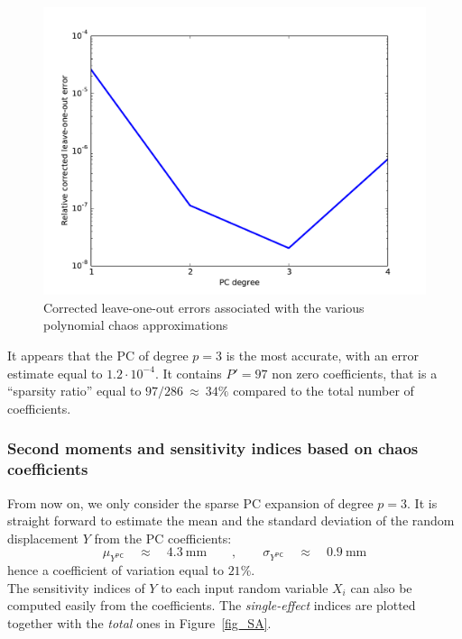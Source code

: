 \documentclass[11pt]{article}
\begin{document}
\begin{figure}[Hhbtp]
  \begin{center}
    \includegraphics[width=12cm]{Figures/Truss_errors.pdf}
  \end{center}
  \caption{Corrected leave-one-out errors associated with the various polynomial chaos approximations}
  \label{fig_errors}
\end{figure}

It appears that the PC of degree $p=3$ is the most accurate, with an error estimate equal to $1.2 \cdot 10^{-4}$. It contains $P'=97$ non zero coefficients, that is a ``sparsity ratio'' equal to $97 / 286~\approx~ 34\%$ compared to the total number of coefficients.

\subsubsection{Second moments and sensitivity indices based on chaos coefficients}

From now on, we only consider the sparse PC expansion of degree $p=3$. It is straight forward to estimate the mean and the standard deviation of the random displacement $Y$ from the PC coefficients:
\begin{equation}
  \mu_{Y^\textsf{PC}} \quad \approx \quad 4.3~\mbox{mm} \qquad , \qquad \sigma_{Y^\textsf{PC}} \quad \approx \quad 0.9~\mbox{mm}
\end{equation}
hence a coefficient of variation equal to $21\%$. \\

The sensitivity indices of $Y$ to each input random variable $X_i$ can also be computed easily from the coefficients. The \emph{single-effect} indices are plotted together with the \emph{total} ones in Figure~\ref{fig_SA}.
\end{document}
